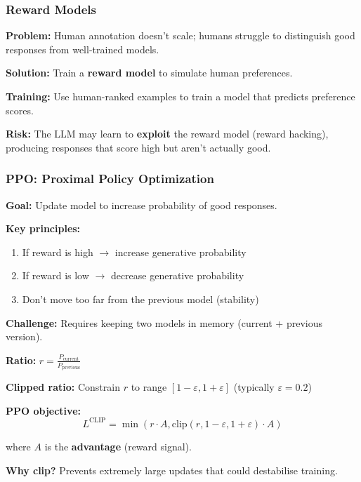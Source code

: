 \bigseparator

\subsubsection{Reward Models}

\begin{defbox}
\textbf{Problem:} Human annotation doesn't scale; humans struggle to distinguish good responses from well-trained models.

\textbf{Solution:} Train a \textbf{reward model} to simulate human preferences.

\textbf{Training:} Use human-ranked examples to train a model that predicts preference scores.

\textbf{Risk:} The LLM may learn to \textbf{exploit} the reward model (reward hacking), producing responses that score high but aren't actually good.
\end{defbox}

\bigseparator

\subsubsection{PPO: Proximal Policy Optimization}

\begin{defbox}
\textbf{Goal:} Update model to increase probability of good responses.

\textbf{Key principles:}
\begin{enumerate}
  \item If reward is high $\to$ increase generative probability
  \item If reward is low $\to$ decrease generative probability
  \item Don't move too far from the previous model (stability)
\end{enumerate}

\textbf{Challenge:} Requires keeping two models in memory (current + previous version).
\end{defbox}

\begin{thmbox}
\textbf{Ratio:} $r = \frac{P_{\text{current}}}{P_{\text{previous}}}$

\textbf{Clipped ratio:} Constrain $r$ to range $[1-\varepsilon, 1+\varepsilon]$ (typically $\varepsilon = 0.2$)

\textbf{PPO objective:}
\[
L^{\text{CLIP}} = \min\left( r \cdot A, \text{clip}(r, 1-\varepsilon, 1+\varepsilon) \cdot A \right)
\]

where $A$ is the \textbf{advantage} (reward signal).

\textbf{Why clip?} Prevents extremely large updates that could destabilise training.
\end{thmbox}

